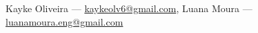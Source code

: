 Kayke Oliveira --- \href{mailto:kaykeolv6@gmail.com}{kaykeolv6@gmail.com}, Luana Moura --- \href{mailto:luanamoura.eng@gmail.com}{luanamoura.eng@gmail.com}
